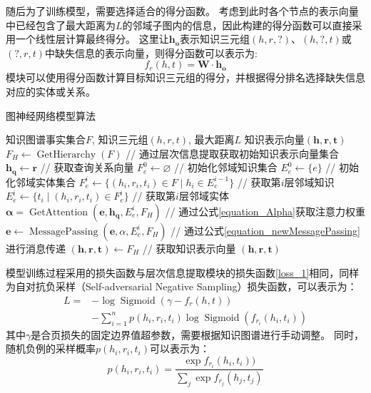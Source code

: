 \documentclass[algorithmlist, AutoFakeBold, AutoFakeSlant, figurelist, tablelist, nomlist, engineering]{seuthesix}
\begin{document}
随后为了训练模型，需要选择适合的得分函数。
考虑到此时各个节点的表示向量中已经包含了最大距离为$L$的邻域子图内的信息，因此构建的得分函数可以直接采用一个线性层计算最终得分。
这里让$\bm{h_o}$表示知识三元组$(h, r, ?)$、$(h, ?, t)$或$(?, r, t)$中缺失信息的表示向量，则得分函数可以表示为:
\begin{equation}
  f_{r}(h, t) = \mathbf{W} \cdot \bm{h_o}
  \label{equation_GNNScore}
\end{equation}
模块可以使用得分函数计算目标知识三元组的得分，并根据得分排名选择缺失信息对应的实体或关系。

\begin{algorithm}[t]
	\caption{图神经网络模型算法}  
	\label{algorithm_GNN}
	\begin{algorithmic}[1]
  \Require 知识图谱事实集合$F$, 知识三元组$(h, r, t)$, 最大距离$L$
  \Ensure 知识表示向量$(\bm{h}, \bm{r}, \bm{t})$
  \State $F_H \leftarrow \operatorname{GetHierarchy}(F)$ // 通过层次信息提取获取初始知识表示向量集合
  \State $\bm{h_q} \leftarrow \bm{r}$ // 获取查询关系向量
  \State $F_{e}^{0} \leftarrow \varnothing$ // 初始化邻域知识集合
  \State $E_{e}^{0} \leftarrow \{e\}$ // 初始化邻域实体集合
  \State $F_{e}^{i} \leftarrow \{(h_i, r_i, t_i) \in F \mid h_i \in E_{e}^{i-1}\}$ // 获取第$i$层邻域知识
  \State $E_{e}^{i} \leftarrow \{t_i \mid (h_i, r_i, t_i) \in F_{e}^{i}\}$ // 获取第$i$层邻域实体
  \State $\bm{\alpha} = \operatorname{GetAttention}(\bm{e}, \bm{h_q}, E_{e}^{i}, F_H)$ // 通过公式\ref{equation_Alpha}获取注意力权重
  \State $\bm{e} \leftarrow \operatorname{MessagePassing}(\bm{e}, \alpha, E_{e}^{i}, F_H)$ // 通过公式\ref{equation_newMessagePassing}进行消息传递
  \EndFor
  \EndFor
  \EndFor
  \State $(\bm{h}, \bm{r}, \bm{t}) \leftarrow F_H$ // 获取知识表示向量
  \State \Return $(\bm{h}, \bm{r}, \bm{t})$
	\end{algorithmic}
\end{algorithm} 

模型训练过程采用的损失函数与层次信息提取模块的损失函数\ref{loss_1}相同，同样为自对抗负采样（Self-adversarial Negative Sampling）损失函数，可以表示为：
\begin{equation}
  \begin{aligned}
  L= & -\log \operatorname{Sigmoid}\left(\gamma-f_r(h, t)\right) \\
  & -\sum_{i=1}^n p\left(h_i, r_i, t_i\right) \log \operatorname{Sigmoid}(f_{r_i}(h_i, t_i))
  \end{aligned}
\end{equation}
其中$\gamma$是合页损失的固定边界值超参数，需要根据知识图谱进行手动调整。
同时，随机负例的采样概率$p(h_i, r_i, t_i)$可以表示为：
\begin{equation}
  p(h_i, r_i, t_i)=\frac{\exp f_{r_i}(h_i, t_i))}{\sum_j \exp f_{r_j}(h_j, t_j)}
\end{equation}
\end{document}
